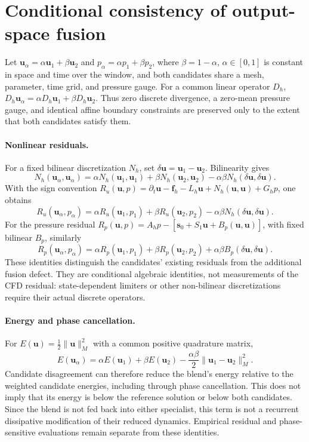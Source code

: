 \section{Conditional consistency of output-space fusion}
\label{app:fusion_consistency}
Let $\bm u_\alpha=\alpha\bm u_1+\beta\bm u_2$ and $p_\alpha=\alpha p_1+\beta p_2$, where $\beta=1-\alpha$, $\alpha\in[0,1]$ is constant in space and time over the window, and both candidates share a mesh, parameter, time grid, and pressure gauge. For a common linear operator $D_h$, $D_h\bm u_\alpha=\alpha D_h\bm u_1+\beta D_h\bm u_2$. Thus zero discrete divergence, a zero-mean pressure gauge, and identical affine boundary constraints are preserved only to the extent that both candidates satisfy them.

\paragraph{Nonlinear residuals.}
For a fixed bilinear discretization $N_h$, set $\delta\bm u=\bm u_1-\bm u_2$. Bilinearity gives
\begin{equation}
N_h(\bm u_\alpha,\bm u_\alpha)
=\alpha N_h(\bm u_1,\bm u_1)+\beta N_h(\bm u_2,\bm u_2)
-\alpha\beta N_h(\delta\bm u,\delta\bm u).
\end{equation}
With the sign convention
$R_u(\bm u,p)=\partial_t\bm u-\bm f_h-L_h\bm u+N_h(\bm u,\bm u)+G_hp$, one obtains
\begin{equation}
R_u(\bm u_\alpha,p_\alpha)
=\alpha R_u(\bm u_1,p_1)+\beta R_u(\bm u_2,p_2)
-\alpha\beta N_h(\delta\bm u,\delta\bm u).
\end{equation}
For the pressure residual
$R_p(\bm u,p)=A_hp-[\bm s_0+S_1\bm u+B_p(\bm u,\bm u)]$, with fixed bilinear $B_p$, similarly
\begin{equation}
R_p(\bm u_\alpha,p_\alpha)
=\alpha R_p(\bm u_1,p_1)+\beta R_p(\bm u_2,p_2)
+\alpha\beta B_p(\delta\bm u,\delta\bm u).
\end{equation}
These identities distinguish the candidates' existing residuals from the additional fusion defect. They are conditional algebraic identities, not measurements of the CFD residual: state-dependent limiters or other non-bilinear discretizations require their actual discrete operators.

\paragraph{Energy and phase cancellation.}
For $E(\bm u)=\tfrac12\|\bm u\|_M^2$ with a common positive quadrature matrix,
\begin{equation}
E(\bm u_\alpha)=\alpha E(\bm u_1)+\beta E(\bm u_2)
-\frac{\alpha\beta}{2}\|\bm u_1-\bm u_2\|_M^2.
\end{equation}
Candidate disagreement can therefore reduce the blend's energy relative to the weighted candidate energies, including through phase cancellation. This does not imply that its energy is below the reference solution or below both candidates. Since the blend is not fed back into either specialist, this term is not a recurrent dissipative modification of their reduced dynamics. Empirical residual and phase-sensitive evaluations remain separate from these identities.

